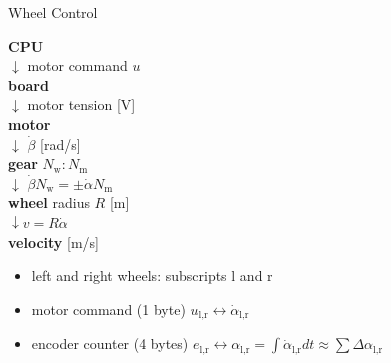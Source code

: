 \documentclass{beamer}
\begin{document}
\begin{frame}{Wheel Control}
  
  \begin{minipage}{0.3\columnwidth}
    \textbf{CPU}\\
    $\downarrow$ motor command $u$\\
    \textbf{board}\\
    $\downarrow$ motor tension [V]\\
    \textbf{motor}\\
    $\downarrow$ $\dot\beta$ [rad/s]\\
    \textbf{gear} $N_\text{w}:N_\text{m}$\\
    $\downarrow$ $\dot\beta N_\text{w} = \pm \dot\alpha N_\text{m}$\\
    \textbf{wheel} radius $R$ [m]\\
    $\downarrow v = R \dot\alpha$\\
    \textbf{velocity} [m/s]
  \end{minipage}
  \hfill
  \begin{minipage}{0.65\columnwidth}    
    \def\svgwidth{\columnwidth}
    
  \end{minipage}
  
  \vfill
  
  \begin{itemize}
  \item
    left and right wheels: subscripts l and r
  \item
    motor command (1 byte) $u_\text{l,r} \leftrightarrow \dot\alpha_\text{l,r}$
  \item
    encoder counter (4 bytes) $e_\text{l,r} \leftrightarrow \alpha_\text{l,r} = \int \dot\alpha_\text{l,r} dt \approx \sum\Delta\alpha_\text{l,r}$
  \end{itemize}
  
\end{frame}
\end{document}

